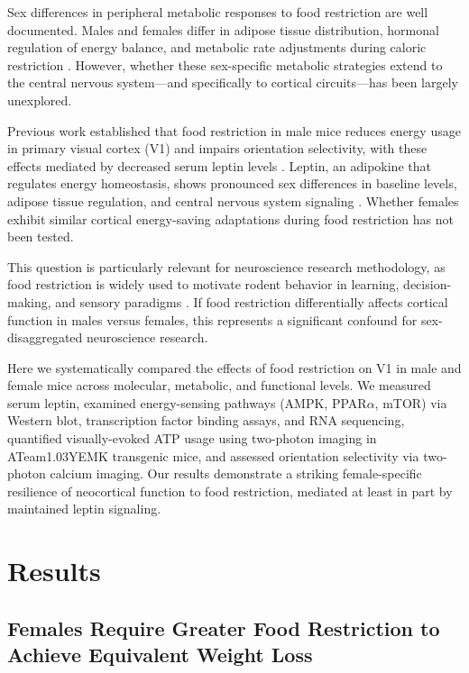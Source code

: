 \documentclass[11pt]{article}
\begin{document}
Sex differences in peripheral metabolic responses to food restriction are well documented. Males and females differ in adipose tissue distribution, hormonal regulation of energy balance, and metabolic rate adjustments during caloric restriction \citep{sex_diff_metabolism2009}. However, whether these sex-specific metabolic strategies extend to the central nervous system---and specifically to cortical circuits---has been largely unexplored.

Previous work established that food restriction in male mice reduces energy usage in primary visual cortex (V1) and impairs orientation selectivity, with these effects mediated by decreased serum leptin levels \citep{leptin_brain2011}. Leptin, an adipokine that regulates energy homeostasis, shows pronounced sex differences in baseline levels, adipose tissue regulation, and central nervous system signaling \citep{leptin_sex_diff2015, leptin_resistance2016}. Whether females exhibit similar cortical energy-saving adaptations during food restriction has not been tested.

This question is particularly relevant for neuroscience research methodology, as food restriction is widely used to motivate rodent behavior in learning, decision-making, and sensory paradigms \citep{food_restriction_behavior2015}. If food restriction differentially affects cortical function in males versus females, this represents a significant confound for sex-disaggregated neuroscience research.

Here we systematically compared the effects of food restriction on V1 in male and female mice across molecular, metabolic, and functional levels. We measured serum leptin, examined energy-sensing pathways (AMPK, PPAR$\alpha$, mTOR) via Western blot, transcription factor binding assays, and RNA sequencing, quantified visually-evoked ATP usage using two-photon imaging in ATeam1.03YEMK transgenic mice, and assessed orientation selectivity via two-photon calcium imaging. Our results demonstrate a striking female-specific resilience of neocortical function to food restriction, mediated at least in part by maintained leptin signaling.

\section{Results}

\subsection{Females Require Greater Food Restriction to Achieve Equivalent Weight Loss}
\end{document}
